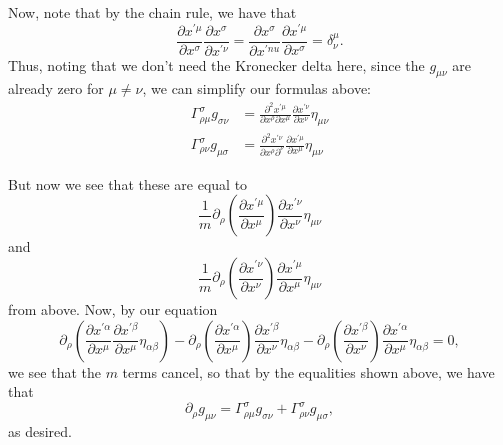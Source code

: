 \documentclass[12pt]{article}
\theoremstyle{definition}
\theoremstyle{remark}
\begin{document}
	Now, note that by the chain rule, we have that 
	\[
	\frac{ \partial x^{ \prime \mu } }{ \partial x^{ \sigma } } 
	\frac{ \partial x^{ \sigma } }{ \partial x^{ \prime \nu } } 
	=
	\frac{ \partial x^{ \sigma } }{ \partial x^{ \prime nu } } 
	\frac{ \partial x^{ \prime \mu } }{ \partial x^{ \sigma } }
	=
	\delta_{\nu}^{ \mu }.
	\]
	Thus, noting that we don't need the Kronecker delta here, since the $g_{ \mu \nu }$ are already zero for $\mu \neq \nu$, we can simplify our formulas above:
	\begin{align*}
	\Gamma_{\rho \mu }^{ \sigma } g_{ \sigma \nu } &= 
	\frac{ \partial^2 x^{ \prime \mu } }{ \partial x^{ \rho } \partial x^{ \mu } } 
	\frac{ \partial x^{ \prime \nu } }{ \partial x^{ \nu } } \eta_{ \mu \nu } \\
	\Gamma_{ \rho \nu }^{ \sigma } g_{ \mu \sigma } 
	&= 
	\frac{ \partial^2 x^{ \prime \nu } }{ \partial x^{ \rho }  \partial ^{ \nu } } 
	\frac{ \partial x^{ \prime \mu } }{ \partial x^{ \mu } }  \eta_{ \mu \nu } 
	\end{align*}

	But now we see that these are equal to 
	\[
	\frac{ 1}{m} \partial_{ \rho } \left( \frac{ \partial x^{ \prime \mu } }{ \partial x^{ \mu } } \right) \frac{ \partial x^{ \prime \nu } }{ \partial x^{ \nu } } \eta_{ \mu \nu }
	\]
	and 
	\[
	\frac{ 1}{ m} \partial_{ \rho } \left( \frac{ \partial x^{ \prime \nu } }{ \partial x^{ \nu } } \right) \frac{ \partial x^{ \prime \mu } }{ \partial x^{ \mu }  } \eta_{ \mu \nu } 
	\]
	from above. Now, by our equation 
	\[
	\partial_{\rho} 
	\left( \frac{ \partial x^{ \prime \alpha } }{ \partial x^{ \mu } } 
	\frac{ \partial x^{ \prime \beta } }{ \partial x^{ \mu } } 
	\eta_{ \alpha \beta } \right)
	-
	\partial_{ \rho }
	\left( \frac{ \partial x^{ \prime \alpha } }{ \partial x^{ \mu } } \right) 
	\frac{ \partial x^{ \prime \beta } }{ \partial x^{ \nu } } 
	\eta_{ \alpha \beta }
	-
	\partial_{ \rho } 
	\left( \frac{ \partial x^{ \prime \beta } }{ \partial x^{ \nu } } \right) 
	\frac{ \partial x^{ \prime \alpha } }{ \partial x^{ \mu } } \eta_{\alpha \beta } 
	=
	0, 
	\]
	we see that the $m$ terms cancel, so that by the equalities shown above, we have that 
	\[
	\partial_{ \rho } g_{ \mu \nu } = \Gamma_{ \rho \mu }^{ \sigma } g_{ \sigma \nu } + \Gamma_{ \rho \nu }^{ \sigma } g_{ \mu \sigma } ,
	\]
	as desired.  \\
\end{document}
